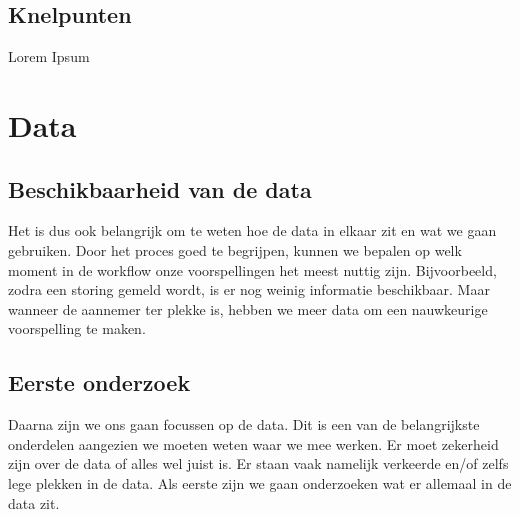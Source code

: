 \documentclass{article}
\begin{document}
\subsection{Knelpunten}
Lorem Ipsum

\newpage
\section{Data}

\subsection{Beschikbaarheid van de data}
Het is dus ook belangrijk om te weten hoe de data in elkaar zit en wat we gaan gebruiken. Door het proces goed te begrijpen, kunnen we bepalen op welk moment in de workflow onze voorspellingen het meest nuttig zijn. Bijvoorbeeld, zodra een storing gemeld wordt, is er nog weinig informatie beschikbaar. Maar wanneer de aannemer ter plekke is, hebben we meer data om een nauwkeurige voorspelling te maken.

\subsection{Eerste onderzoek}
Daarna zijn we ons gaan focussen op de data. Dit is een van de belangrijkste onderdelen aangezien we moeten weten waar we mee werken. Er moet zekerheid zijn over de data of alles wel juist is. Er staan vaak namelijk verkeerde en/of zelfs lege plekken in de data. Als eerste zijn we gaan onderzoeken wat er allemaal in de data zit.
\end{document}
